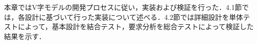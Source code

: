 
本章ではV字モデルの開発プロセスに従い，実装および検証を行った．4.1節では，各設計に基づいて行った実装について述べる．4.2節では詳細設計を単体テストによって，基本設計を結合テスト，要求分析を総合テストによって検証した結果を示す．